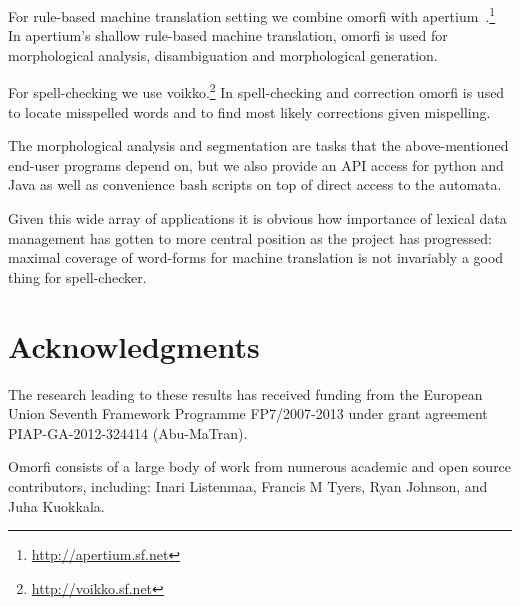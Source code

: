 \documentclass[11pt]{article}
\begin{document}
For rule-based machine translation setting we combine omorfi with
apertium~\cite{apertium}.\footnote{\url{http://apertium.sf.net}} In
apertium's shallow rule-based machine translation, omorfi is used for
morphological analysis, disambiguation and morphological generation.

For spell-checking we use voikko.\footnote{\url{http://voikko.sf.net}} In
spell-checking and correction omorfi is used to locate misspelled words
and to find most likely corrections given mispelling.~\cite{pirinen2014state}

The morphological analysis and segmentation are tasks that the above-mentioned
end-user programs depend on, but we also provide an API access for python and
Java as well as convenience bash scripts on top of direct access to the
automata.

Given this wide array of applications it is obvious how importance of lexical
data management has gotten to more central position as the project has
progressed: maximal coverage of word-forms for machine translation is not
invariably a good thing for spell-checker.

\section*{Acknowledgments}

The research leading to these results has received
funding from the European Union Seventh Framework
Programme FP7/2007-2013 under grant agreement
PIAP-GA-2012-324414 (Abu-MaTran).

Omorfi consists of a large body of work from numerous academic and open source contributors,
including: Inari Listenmaa, Francis M Tyers, Ryan
Johnson, and Juha Kuokkala.



\end{document}
